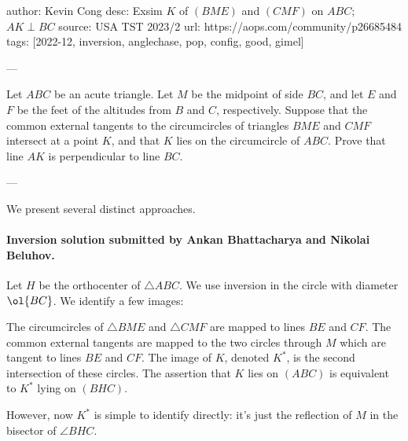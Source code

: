 author: Kevin Cong
desc: Exsim $K$ of $(BME)$ and $(CMF)$ on $ABC$; $AK \perp BC$
source: USA TST 2023/2
url: https://aops.com/community/p26685484
tags: [2022-12, inversion, anglechase, pop, config, good, gimel]

---

Let $ABC$ be an acute triangle.
Let $M$ be the midpoint of side $BC$,
and let $E$ and $F$ be the feet of the altitudes from $B$ and $C$, respectively.
Suppose that the common external tangents
to the circumcircles of triangles $BME$ and $CMF$ intersect at a point $K$,
and that $K$ lies on the circumcircle of $ABC$.
Prove that line $AK$ is perpendicular to line $BC$.

---

We present several distinct approaches.

\paragraph{Inversion solution submitted by Ankan Bhattacharya and Nikolai Beluhov.}
Let $H$ be the orthocenter of $\triangle ABC$.
We use inversion in the circle with diameter $\ol{BC}$.
We identify a few images:
\begin{itemize}
  \ii The circumcircles of $\triangle BME$ and $\triangle CMF$ are mapped to lines $BE$ and $CF$.
  \ii The common external tangents are mapped to the two circles through $M$
  which are tangent to lines $BE$ and $CF$.
  \ii The image of $K$, denoted $K^\ast$, is the second intersection of these circles.
  \ii The assertion that $K$ lies on $(ABC)$ is equivalent to $K^\ast$ lying on $(BHC)$.
\end{itemize}
However, now $K^\ast$ is simple to identify directly:
it's just the reflection of $M$ in the bisector of $\angle BHC$.

